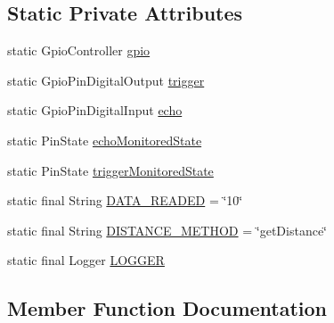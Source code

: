 \subsection*{Static Private Attributes}
\begin{DoxyCompactItemize}
\item 
static Gpio\+Controller \hyperlink{classcom_1_1libsensorj_1_1concretesensor_1_1test_1_1HCSR04DeviceTests_a633636296bc508c587ec96215ae90f49}{gpio}
\item 
static Gpio\+Pin\+Digital\+Output \hyperlink{classcom_1_1libsensorj_1_1concretesensor_1_1test_1_1HCSR04DeviceTests_a1284eaac23d3414b8115c58e3daf10c0}{trigger}
\item 
static Gpio\+Pin\+Digital\+Input \hyperlink{classcom_1_1libsensorj_1_1concretesensor_1_1test_1_1HCSR04DeviceTests_aa5c0c872aec976b3c6eba9ca14eaee21}{echo}
\item 
static Pin\+State \hyperlink{classcom_1_1libsensorj_1_1concretesensor_1_1test_1_1HCSR04DeviceTests_aa1dee7612489b95ae1e84834018f612c}{echo\+Monitored\+State}
\item 
static Pin\+State \hyperlink{classcom_1_1libsensorj_1_1concretesensor_1_1test_1_1HCSR04DeviceTests_ae6c52d9bfe127814bf0b2566d4671ef3}{trigger\+Monitored\+State}
\item 
static final String \hyperlink{classcom_1_1libsensorj_1_1concretesensor_1_1test_1_1HCSR04DeviceTests_a76e128e04a46245fcef0b87f377b9b7c}{D\+A\+T\+A\+\_\+\+R\+E\+A\+D\+E\+D} = \char`\"{}10\char`\"{}
\item 
static final String \hyperlink{classcom_1_1libsensorj_1_1concretesensor_1_1test_1_1HCSR04DeviceTests_a47cef441c2f68e1f55e5dfb6b1fef3c8}{D\+I\+S\+T\+A\+N\+C\+E\+\_\+\+M\+E\+T\+H\+O\+D} = \char`\"{}get\+Distance\char`\"{}
\item 
static final Logger \hyperlink{classcom_1_1libsensorj_1_1concretesensor_1_1test_1_1HCSR04DeviceTests_a5bceb1147cb539bde62dad0d4f95e3cf}{L\+O\+G\+G\+E\+R}
\end{DoxyCompactItemize}


\subsection{Member Function Documentation}
\hypertarget{classcom_1_1libsensorj_1_1concretesensor_1_1test_1_1HCSR04DeviceTests_a03c2c422c08b49925990bc542e72020a}{}
